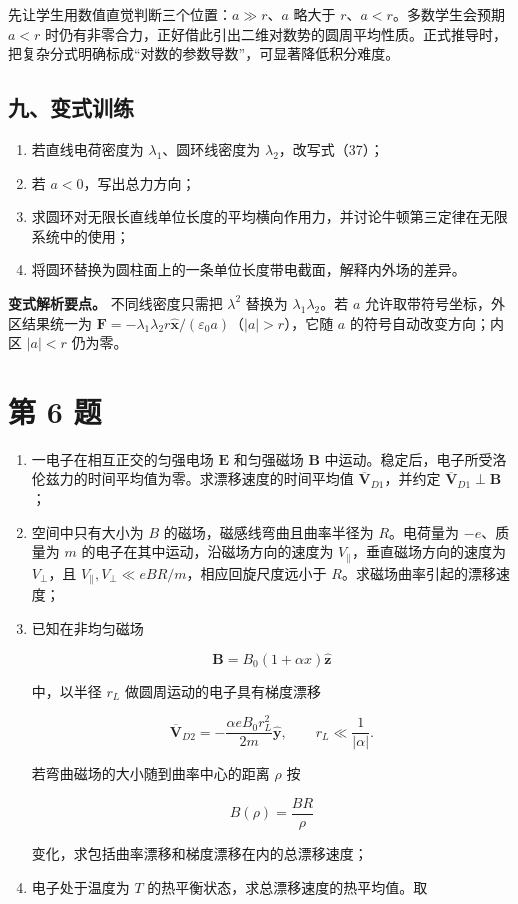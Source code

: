 \documentclass[12pt,a4paper,UTF8]{ctexart}
\newcommand{\tightlist}{\setlength{\itemsep}{0pt}\setlength{\parskip}{0pt}}
\begin{document}
先让学生用数值直觉判断三个位置：\(a\gg r\)、\(a\) 略大于
\(r\)、\(a<r\)。多数学生会预期 \(a<r\)
时仍有非零合力，正好借此引出二维对数势的圆周平均性质。正式推导时，把复杂分式明确标成``对数的参数导数''，可显著降低积分难度。

\subsection{九、变式训练}\label{ux4e5dux53d8ux5f0fux8badux7ec3-4}

\begin{enumerate}
\def\labelenumi{\arabic{enumi}.}
\tightlist
\item
  若直线电荷密度为 \(\lambda_1\)、圆环线密度为
  \(\lambda_2\)，改写式（37）；
\item
  若 \(a<0\)，写出总力方向；
\item
  求圆环对无限长直线单位长度的平均横向作用力，并讨论牛顿第三定律在无限系统中的使用；
\item
  将圆环替换为圆柱面上的一条单位长度带电截面，解释内外场的差异。
\end{enumerate}

\textbf{变式解析要点。} 不同线密度只需把 \(\lambda^2\) 替换为
\(\lambda_1\lambda_2\)。若 \(a\) 允许取带符号坐标，外区结果统一为
\(\boldsymbol F=-\lambda_1\lambda_2r\hat{\boldsymbol x}/(\varepsilon_0a)\)（\(|a|>r\)），它随
\(a\) 的符号自动改变方向；内区 \(|a|<r\) 仍为零。

\newpage

\section{第 6 题}\label{ux7b2c-6-ux9898}

\begin{enumerate}
\def\labelenumi{\arabic{enumi}.}
\item
  一电子在相互正交的匀强电场 \(\boldsymbol E\) 和匀强磁场
  \(\boldsymbol B\)
  中运动。稳定后，电子所受洛伦兹力的时间平均值为零。求漂移速度的时间平均值
  \(\overline{\boldsymbol V}_{D1}\)，并约定
  \(\overline{\boldsymbol V}_{D1}\perp\boldsymbol B\)；
\item
  空间中只有大小为 \(B\) 的磁场，磁感线弯曲且曲率半径为 \(R\)。电荷量为
  \(-e\)、质量为 \(m\) 的电子在其中运动，沿磁场方向的速度为
  \(V_{\parallel}\)，垂直磁场方向的速度为 \(V_{\perp}\)，且
  \(V_{\parallel},V_{\perp}\ll eBR/m\)，相应回旋尺度远小于
  \(R\)。求磁场曲率引起的漂移速度；
\item
  已知在非均匀磁场

  \[
  \boldsymbol B=B_0(1+\alpha x)\hat{\boldsymbol z}
  \]

  中，以半径 \(r_L\) 做圆周运动的电子具有梯度漂移

  \[
  \overline{\boldsymbol V}_{D2}
  =-\frac{\alpha eB_0r_L^2}{2m}\hat{\boldsymbol y},
  \qquad r_L\ll\frac1{|\alpha|}.
  \]

  若弯曲磁场的大小随到曲率中心的距离 \(\rho\) 按

  \[
  B(\rho)=\frac{BR}{\rho}
  \]

  变化，求包括曲率漂移和梯度漂移在内的总漂移速度；
\item
  电子处于温度为 \(T\) 的热平衡状态，求总漂移速度的热平均值。取
\end{enumerate}
\end{document}

